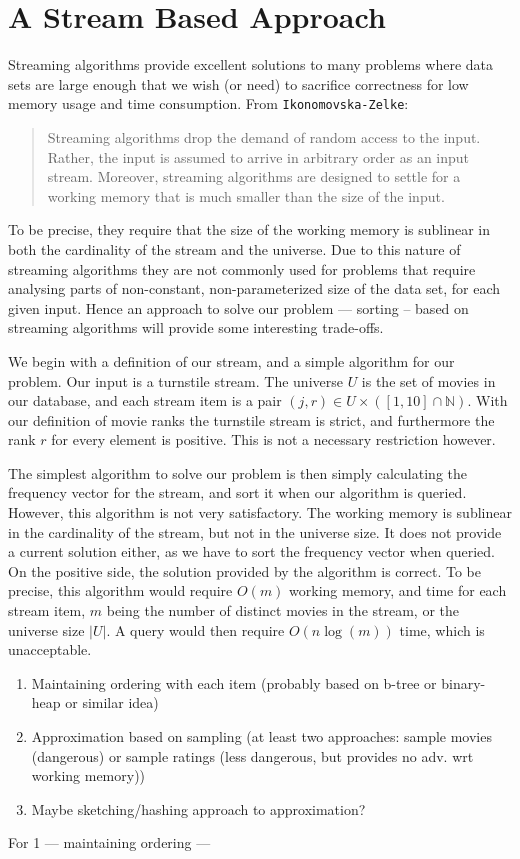 \section*{A Stream Based Approach}
Streaming algorithms provide excellent solutions to many problems where data
sets are large enough that we wish (or need) to sacrifice correctness for low
memory usage and time consumption.
From \texttt{Ikonomovska\--Zelke}:
\begin{quote}
Streaming algorithms drop the demand of random access to the input. Rather, the input
is assumed to arrive in arbitrary order as an input stream. Moreover, streaming algorithms
are designed to settle for a working memory that is much smaller than the size of the input.
\end{quote}
To be precise, they require that the size of the working memory is sublinear in both the cardinality of the stream and the universe.
Due to this nature of streaming algorithms they are not commonly used for
problems that require analysing parts of non-constant, non-parameterized size
of the data set, for each given input. Hence an approach to
solve our problem --- sorting -- based on streaming algorithms will provide some interesting
trade-offs.

We begin with a definition of our stream, and a simple algorithm for our
problem. Our input is a turnstile stream. The universe
$U$ is the set of movies in our database, and each stream item is a pair
$(j,r) \in U\times \left(\left[1,10\right]\cap \mathbb{N}\right)$.
With our definition of movie ranks the turnstile stream is strict, and furthermore
the rank $r$ for every element is positive. This is not a necessary restriction
however.

The simplest algorithm to solve our problem is then simply calculating the
frequency vector for the stream, and sort it when our algorithm is queried.
However, this algorithm is not very satisfactory. The working memory is
sublinear in the cardinality of the stream, but not in the universe size. It
does not provide a current solution either, as we have to sort the frequency
vector when queried. On the positive side, the solution provided by the
algorithm is correct. To be precise, this algorithm would require $O(m)$ working
memory, and time for each stream item, $m$ being the number of distinct movies
in the stream, or the universe size $|U|$. A query would then require
$O(n \log(m))$ time, which is unacceptable.

\begin{enumerate}
	\item{Maintaining ordering with each item (probably based on b-tree or
		binary-heap or similar idea)}
	\item{Approximation based on sampling (at least two approaches: sample
		movies (dangerous) or sample ratings (less dangerous, but
	provides no adv. wrt working memory))}
	\item{Maybe sketching/hashing approach to approximation?}
\end{enumerate}

For 1 --- maintaining ordering --- 
